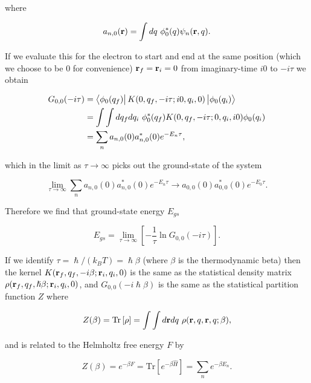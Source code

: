 where

\begin{equation}
    a_{n,0}(\vb{r}) = \int dq\ \phi^*_0(q) 
    \psi_n(\vb{r}, q).
\end{equation}

If we evaluate this for the electron to start and end at the same position (which we choose to be $0$ for convenience) $\vb{r}_f = \vb{r}_i = 0$ from imaginary-time $i0$ to $-i\tau$ we obtain

\begin{equation}
    \begin{aligned}
    G_{0,0}(-i\tau) &= \bra{\phi_0(q_f)} K(0, q_f, -i\tau; i0, q_i, 0) \ket{\phi_0(q_i)} \\
    &= \int\int dq_f dq_i\ \phi_0^*(q_f) K(0, q_f, -i\tau; 0, q_i, i0) \phi_0(q_i) \\
    &= \sum_n a_{n,0}(0) a^*_{n,0}(0) e^{-E_n \tau},
    \end{aligned}
\end{equation}

which in the limit as $\tau \to \infty$ picks out the ground-state of the system

\begin{equation}
    \lim_{\tau \to \infty} \sum_n a_{n,0}(0) a^*_{n,0}(0) e^{-E_n \tau} \rightarrow a_{0,0}(0) a^*_{0,0}(0) e^{-E_0 \tau}.
\end{equation}

Therefore we find that ground-state energy $E_{gs}$

\begin{equation}
    E_{gs} = \lim_{\tau \to \infty} \left[-\frac{1}{\tau} \ln G_{0,0}(-i\tau) \right].
\end{equation}

If we identify $\tau = \hslash /(k_B T) = \hslash\beta$ (where $\beta$ is the thermodynamic beta) then the kernel $K(\vb{r}_{f}, q_f, -i\beta; \vb{r}_{i}, q_i, 0)$ is the same as the statistical density matrix $\rho(\vb{r}_{f}, q_f, \hslash\beta; \vb{r}_{i}, q_i, 0)$, and $G_{0,0}(-i\hslash\beta)$ is the same as the statistical partition function $Z$ where

\begin{equation}
    Z(\beta) = \textrm{Tr} \left[\rho\right] = \int \int d\vb{r} dq\ \rho(\vb{r}, q, \vb{r}, q; \beta),
\end{equation}

and is related to the Helmholtz free energy $F$ by

\begin{equation}
    Z(\beta) = e^{-\beta F} = \textrm{Tr}\left[ e^{-\beta \hat{H}}\right] = \sum_n e^{-\beta E_n}.
\end{equation}


